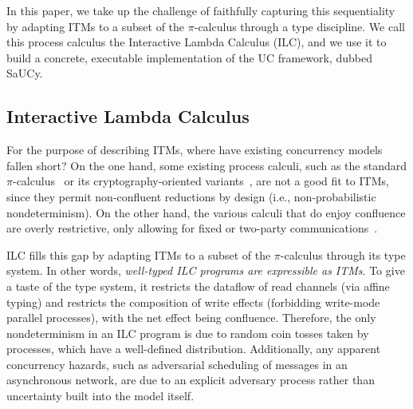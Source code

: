 In this paper, we take up the challenge of faithfully capturing this
sequentiality by adapting ITMs to a subset of the $\pi$-calculus through a type
discipline. We call this process calculus the Interactive Lambda Calculus (ILC),
and we use it to build a concrete, executable implementation of the UC
framework, dubbed SaUCy.


\subsection{Interactive Lambda Calculus}

For the purpose of describing ITMs, where have existing concurrency models
fallen short? On the one hand, some existing process calculi, such as the
standard $\pi$-calculus~\cite{milner1999communicating} or its
cryptography-oriented variants~\cite{abadi1999calculus, abadi2001mobile,
  lincoln1998probabilistic}, are not a good fit to ITMs, since they permit
non-confluent reductions by design (i.e., non-probabilistic nondeterminism).
On the other hand, the various calculi that do enjoy confluence are overly
restrictive, only allowing for fixed or two-party
communications~\cite{kobayashi1999linearity,bohl2016symbolic,fowler2018session}.

ILC fills this gap by adapting ITMs to a subset of the $\pi$-calculus through its
type system. In other words, \emph{well-typed ILC programs are expressible as
  ITMs}. To give a taste of the type system, it restricts the dataflow of read
channels (via affine typing) and restricts the composition of write effects
(forbidding write-mode parallel processes), with the net effect being
confluence. Therefore, the only nondeterminism in an ILC program is due to
random coin tosses taken by processes, which have a well-defined
distribution. Additionally, any apparent concurrency hazards, such as
adversarial scheduling of messages in an asynchronous network, are due to an
explicit adversary process rather than uncertainty built into the model itself.

